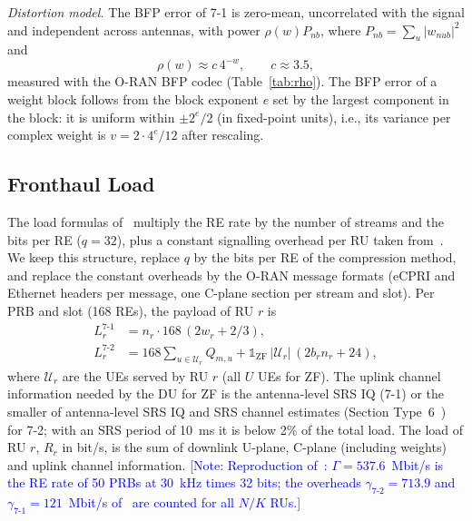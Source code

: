 \documentclass[10pt, final, journal, letterpaper, twocolumn]{IEEEtran}
\newcommand{\note}[1]{\textcolor{blue}{[Note: #1]}}
\begin{document}
\emph{Distortion model.} The BFP error of 7-1 is zero-mean, uncorrelated with the signal and independent across antennas, with power $\rho(w)P_{nb}$, where $P_{nb}=\sum_u|w_{nub}|^2$ and
\begin{equation}
  \rho(w) \approx c\,4^{-w},\qquad c\approx 3.5 ,
  \label{eq:rho}
\end{equation}
measured with the O-RAN BFP codec (Table~\ref{tab:rho}). The BFP error of a weight block follows from the block exponent $e$ set by the largest component in the block: it is uniform within $\pm 2^{e}/2$ (in fixed-point units), i.e., its variance per complex weight is $v = 2\cdot 4^{e}/12$ after rescaling.

\begin{table}[t]
\centering
\caption{Relative distortion $\rho(w)$ of the O-RAN BFP codec (block of 12 REs, 16-bit input, 15~dB back-off).}
\label{tab:rho}
\footnotesize
{}
\end{table}

\subsection{Fronthaul Load}
\label{subsec:load}

The load formulas of~\cite{girycki2024eucnc} multiply the RE rate by the number of streams and the bits per RE ($q=32$), plus a constant signalling overhead per RU taken from~\cite{tr38816}. We keep this structure, replace $q$ by the bits per RE of the compression method, and replace the constant overheads by the O-RAN message formats (eCPRI and Ethernet headers per message, one C-plane section per stream and slot). Per PRB and slot (168 REs), the payload of RU $r$ is
\begin{align}
  L^{7\text{-}1}_r &= n_r\cdot 168\,(2w_r + 2/3), \label{eq:l71}\\
  L^{7\text{-}2}_r &= 168\sum_{u\in\mathcal{U}_r} Q_{m,u} + \mathbb{1}_{\mathrm{ZF}}\,|\mathcal{U}_r|\,(2 b_r n_r + 24), \label{eq:l72}
\end{align}
where $\mathcal{U}_r$ are the UEs served by RU $r$ (all $U$ UEs for ZF). The uplink channel information needed by the DU for ZF is the antenna-level SRS IQ (7-1) or the smaller of antenna-level SRS IQ and SRS channel estimates (Section Type~6~\cite{oran_cus_v22}) for 7-2; with an SRS period of 10~ms it is below 2\% of the total load. The load of RU $r$, $R_r$ in bit/s, is the sum of downlink U-plane, C-plane (including weights) and uplink channel information.
\note{Reproduction of~\cite{girycki2024eucnc}: $\Gamma = 537.6$~Mbit/s is the RE rate of 50 PRBs at 30~kHz times 32 bits; the overheads $\gamma_{7\text{-}2}=713.9$ and $\gamma_{7\text{-}1}=121$~Mbit/s of~\cite{tr38816} are counted for all $N/K$ RUs.}
\end{document}
